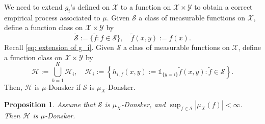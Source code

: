 \documentclass{amsart}
\theoremstyle{plain}
\numberwithin{equation}{section}\newtheorem{theorem}{Theorem}[section]
\newtheorem{proposition}[theorem]{Proposition}
\theoremstyle{remark}
\begin{document}
We need to extend $g_i$'s defined on $\mathcal{X}$ to a function on $\mathcal{X} \times \mathcal{Y}$ to obtain a correct empirical process associated to $\mu$. Given $\mathcal{S}$ a class of measurable functions on $\mathcal{X}$, define a function class on $\mathcal{X} \times \mathcal{Y}$ by
\[
    \widetilde{\mathcal{S}}:=\{\widetilde f:f\in\mathcal{S}\}, \quad \widetilde f(x,y):=f(x).
\]
Recall \eqref{eq: extension of g_i}. Given $\mathcal{S}$ a class of measurable functions on $\mathcal{X}$, define a function class on $\mathcal{X} \times \mathcal{Y}$ by
\[
    \mathcal H:=\bigcup_{k=1}^{K}\mathcal{H}_i, \quad \mathcal{H}_i:=\left\{ h_{i,f}(x,y):=\mathds{1}_{\{y=i\}} \widetilde{f}(x,y): \widetilde{f} \in \mathcal{S} \right\}.
\]
Then, $\mathcal{H}$ is $\mu$-Donsker if $\mathcal{S}$ is $\mu_X$-Donsker.





\begin{proposition}\label{prop: donsker}
Assume that $\mathcal{S}$ is $\mu_X$-Donsker, and $\sup_{f\in\mathcal{S}}|\mu_X (f)|<\infty$. Then $\mathcal H$ is $\mu$-Donsker.
\end{proposition}
\end{document}

